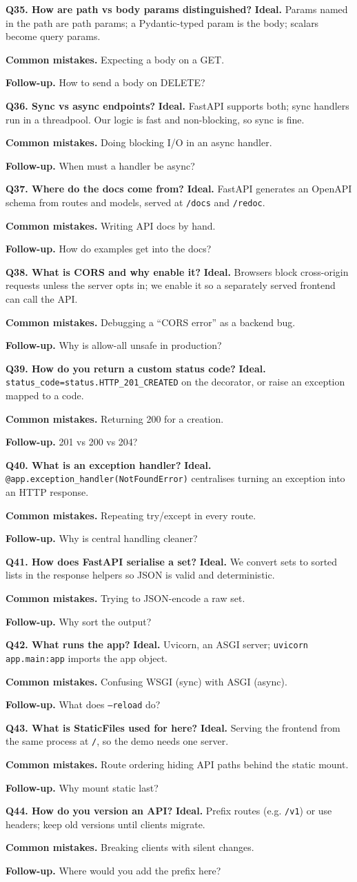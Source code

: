 \documentclass[11pt,a4paper]{report}
\newcommand{\qa}[3]{%
  \textbf{Ideal.} #1\par
  \textbf{Common mistakes.} #2\par
  \textbf{Follow-up.} #3\par
  \vspace{4pt}
}
\begin{document}
\textbf{Q35. How are path vs body params distinguished?}
\qa{Params named in the path are path params; a Pydantic-typed param is the body;
scalars become query params.}
{Expecting a body on a GET.}
{How to send a body on DELETE?}

\textbf{Q36. Sync vs async endpoints?}
\qa{FastAPI supports both; sync handlers run in a threadpool. Our logic is fast
and non-blocking, so sync is fine.}
{Doing blocking I/O in an async handler.}
{When must a handler be async?}

\textbf{Q37. Where do the docs come from?}
\qa{FastAPI generates an OpenAPI schema from routes and models, served at
\texttt{/docs} and \texttt{/redoc}.}
{Writing API docs by hand.}
{How do examples get into the docs?}

\textbf{Q38. What is CORS and why enable it?}
\qa{Browsers block cross-origin requests unless the server opts in; we enable it
so a separately served frontend can call the API.}
{Debugging a ``CORS error'' as a backend bug.}
{Why is allow-all unsafe in production?}

\textbf{Q39. How do you return a custom status code?}
\qa{\texttt{status\_code=status.HTTP\_201\_CREATED} on the decorator, or raise an
exception mapped to a code.}
{Returning 200 for a creation.}
{201 vs 200 vs 204?}

\textbf{Q40. What is an exception handler?}
\qa{\texttt{@app.exception\_handler(NotFoundError)} centralises turning an
exception into an HTTP response.}
{Repeating try/except in every route.}
{Why is central handling cleaner?}

\textbf{Q41. How does FastAPI serialise a set?}
\qa{We convert sets to sorted lists in the response helpers so JSON is valid and
deterministic.}
{Trying to JSON-encode a raw set.}
{Why sort the output?}

\textbf{Q42. What runs the app?}
\qa{Uvicorn, an ASGI server; \texttt{uvicorn app.main:app} imports the app
object.}
{Confusing WSGI (sync) with ASGI (async).}
{What does \texttt{--reload} do?}

\textbf{Q43. What is StaticFiles used for here?}
\qa{Serving the frontend from the same process at \texttt{/}, so the demo needs
one server.}
{Route ordering hiding API paths behind the static mount.}
{Why mount static last?}

\textbf{Q44. How do you version an API?}
\qa{Prefix routes (e.g. \texttt{/v1}) or use headers; keep old versions until
clients migrate.}
{Breaking clients with silent changes.}
{Where would you add the prefix here?}
\end{document}
